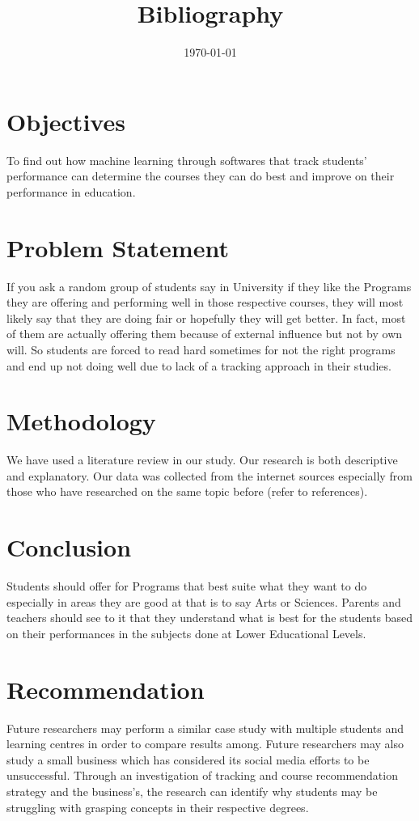 \documentclass{article}
\begin{document}
\section{Objectives}
To find out how machine learning through softwares that track students' performance can determine the courses they can do best and improve on their performance in education.

\section{Problem Statement}
If you ask a random group of students say in University if they like the Programs they are offering and performing well in those respective courses, they will most likely say that they are doing fair or hopefully they will get better. In fact, most of them are actually offering them because of external influence but not by own will. So students are forced to read hard sometimes for not the right programs and end up not doing well due to lack of a tracking approach in their studies.

\section{Methodology}
We have used a literature review in our study. Our research is both descriptive and explanatory. Our data was collected from the internet sources especially from those who have researched on the same topic before (refer to references).

\section{Conclusion}
Students should offer for Programs that best suite what they want to do especially in areas they are good at that is to say Arts or Sciences. Parents and teachers should see to it that they understand what is best for the students based on their performances in the subjects done at Lower Educational Levels.

\section{Recommendation}
Future researchers may perform a similar case study with multiple students and learning centres in order to compare results among. Future researchers may also study a small business which has considered its
social media efforts to be unsuccessful. Through an investigation of tracking and course recommendation strategy and the business’s, the research can identify why students may be struggling with grasping concepts in their respective degrees.

\title{Bibliography}
\author{}
\maketitle
\date{\today}



\end{document}
